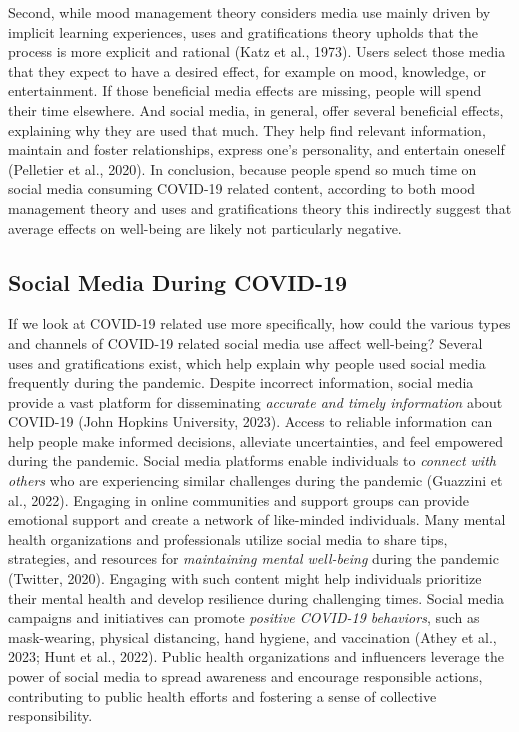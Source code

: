 \documentclass[
  man,mask,floatsintext]{apa7}
\begin{document}
Second, while mood management theory considers media use mainly driven by implicit learning experiences, uses and gratifications theory upholds that the process is more explicit and rational (Katz et al., 1973).
Users select those media that they expect to have a desired effect, for example on mood, knowledge, or entertainment.
If those beneficial media effects are missing, people will spend their time elsewhere.
And social media, in general, offer several beneficial effects, explaining why they are used that much.
They help find relevant information, maintain and foster relationships, express one's personality, and entertain oneself (Pelletier et al., 2020).
In conclusion, because people spend so much time on social media consuming COVID-19 related content, according to both mood management theory and uses and gratifications theory this indirectly suggest that average effects on well-being are likely not particularly negative.

\hypertarget{social-media-during-covid-19}{%
\subsection{Social Media During COVID-19}\label{social-media-during-covid-19}}

If we look at COVID-19 related use more specifically, how could the various types and channels of COVID-19 related social media use affect well-being?
Several uses and gratifications exist, which help explain why people used social media frequently during the pandemic.
Despite incorrect information, social media provide a vast platform for disseminating \emph{accurate and timely information} about COVID-19 (John Hopkins University, 2023).
Access to reliable information can help people make informed decisions, alleviate uncertainties, and feel empowered during the pandemic.
Social media platforms enable individuals to \emph{connect with others} who are experiencing similar challenges during the pandemic (Guazzini et al., 2022).
Engaging in online communities and support groups can provide emotional support and create a network of like-minded individuals.
Many mental health organizations and professionals utilize social media to share tips, strategies, and resources for \emph{maintaining mental well-being} during the pandemic (Twitter, 2020).
Engaging with such content might help individuals prioritize their mental health and develop resilience during challenging times.
Social media campaigns and initiatives can promote \emph{positive COVID-19 behaviors}, such as mask-wearing, physical distancing, hand hygiene, and vaccination (Athey et al., 2023; Hunt et al., 2022).
Public health organizations and influencers leverage the power of social media to spread awareness and encourage responsible actions, contributing to public health efforts and fostering a sense of collective responsibility.
\end{document}
